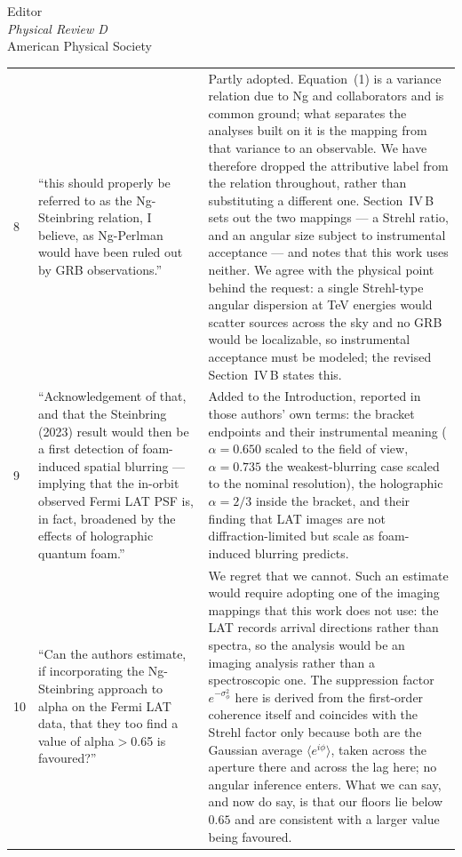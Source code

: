 \documentclass[12pt]{letter}
\begin{document}
\begin{letter}{Editor\\
\textit{Physical Review D}\\
American Physical Society}
\begin{longtable}{@{}p{}p{}p{}@{}}
8 & ``this should properly be referred to as the Ng-Steinbring relation, I
believe, as Ng-Perlman would have been ruled out by GRB observations.''
& Partly adopted.  Equation~(1) is a variance relation due to Ng and
collaborators and is common ground; what separates the analyses built on it
is the mapping from that variance to an observable.  We have therefore
dropped the attributive label from the relation throughout, rather than
substituting a different one.  Section~IV\,B sets out the two mappings --- a
Strehl ratio, and an angular size subject to instrumental acceptance --- and
notes that this work uses neither.  We agree with the physical point behind
the request: a single Strehl-type angular dispersion at TeV energies would
scatter sources across the sky and no GRB would be localizable, so
instrumental acceptance must be modeled; the revised Section~IV\,B states
this. \\[2ex]

9 & ``Acknowledgement of that, and that the Steinbring (2023) result would
then be a first detection of foam-induced spatial blurring --- implying that
the in-orbit observed Fermi LAT PSF is, in fact, broadened by the effects of
holographic quantum foam.''
& Added to the Introduction, reported in those authors' own terms: the
bracket endpoints and their instrumental meaning ($\alpha=0.650$ scaled to
the field of view, $\alpha=0.735$ the weakest-blurring case scaled to the
nominal resolution), the holographic $\alpha=2/3$ inside the bracket, and their
finding that LAT images are not diffraction-limited but scale as
foam-induced blurring predicts. \\[2ex]

10 & ``Can the authors estimate, if incorporating the Ng-Steinbring approach
to alpha on the Fermi LAT data, that they too find a value of alpha$>$0.65 is
favoured?''
& We regret that we cannot.  Such an estimate would require adopting one of
the imaging mappings that this work does not use: the LAT records arrival
directions rather than spectra, so the analysis would be an imaging analysis
rather than a spectroscopic one.  The suppression factor $e^{-\sigma_\phi^2}$
here is derived from the first-order coherence itself and coincides with the
Strehl factor only because both are the Gaussian average $\langle
e^{i\phi}\rangle$, taken across the aperture there and across the lag here;
no angular inference enters.  What we can say, and now do say, is that our
floors lie below $0.65$ and are consistent with a larger value being
favoured. \\[2ex]


\end{longtable}
\end{letter}
\end{document}
